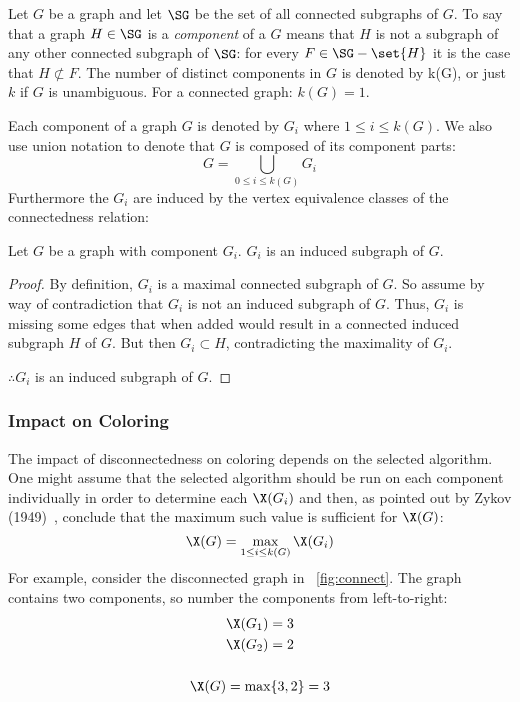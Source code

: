 Let \(G\) be a graph and let \(\SG\) be the set of all connected subgraphs of \(G\).  To say that a graph
\(H\in\SG\) is a \emph{component} of a \(G\) means that \(H\) is not a subgraph of any other connected subgraph of
\(\SG\): for every \(F\in\SG-\set{H}\) it is the case that \(H\not\subset F\).  The number of distinct components
in \(G\) is denoted by k(G), or just \(k\) if \(G\) is unambiguous.  For a connected graph: \(k(G)=1\).

Each component of a graph \(G\) is denoted by \(G_i\) where \(1\le i\le k(G)\).  We also use union notation to
denote that \(G\) is composed of its component parts:
\[G=\bigcup_{0\le i\le k(G)}G_i\]
Furthermore the \(G_i\) are induced by the vertex equivalence classes of the connectedness relation:

\begin{theorem}
  Let \(G\) be a graph with component \(G_i\).  \(G_i\) is an induced subgraph of \(G\).
\end{theorem}

\begin{proof}
  By definition, \(G_i\) is a maximal connected subgraph of \(G\).  So assume by way of contradiction that
  \(G_i\) is not an induced subgraph of \(G\).  Thus, \(G_i\) is missing some edges that when added would result in a
  connected induced subgraph \(H\) of \(G\).  But then \(G_i\subset H\), contradicting the maximality of \(G_i\).

  \(\therefore G_i\) is an induced subgraph of \(G\).
\end{proof}

\subsubsection{Impact on Coloring}\label{sec:sub:sub:impact}

The impact of disconnectedness on coloring depends on the selected algorithm.  One might assume that the selected
algorithm should be run on each component individually in order to determine each \(\X(G_i)\) and then, as pointed
out by Zykov (1949)~\cite{zykov}, conclude that the maximum such value is sufficient for \(\X(G)\):
\[\X(G)=\max_{1\le i\le k(G)}\X(G_i)\]
For example, consider the disconnected graph in \figurename~\ref{fig:connect}.  The graph contains two components,
so number the components from left-to-right:
\begin{gather*}
  \X(G_1)=3 \\
  \X(G_2)=2 \\
  \\
  \X(G)=\max\{3,2\}=3
\end{gather*}

